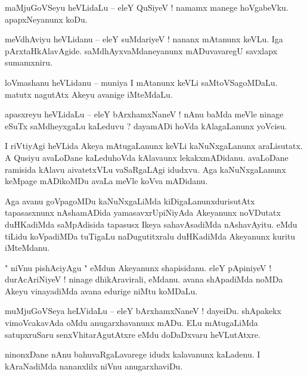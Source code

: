 \documentclass{article}
\begin{document}
\begin{mn}%
maMjuGoVSeyu heVLidaLu -- eleY QuSiyeV ! namamx manege hoVgabeVku. apapxNeyanunx koDu.
\end{mn}

\begin{mn}%
meVdhAviyu heVLidanu -- eleY suMdariyeV ! nananx mAtanunx keVLu. Iga pArxtaHkAlavAgide. 
saMdhAyxvaMdaneyanunx mADuvavaregU savxlapx sumamxniru.
\end{mn}

\begin{mn}%
loVmashanu heVLidanu -- muniya I mAtanunx keVLi saMtoVSagoMDaLu. matutx nagutAtx Akeyu avanige 
iMteMdaLu.
\end{mn}

\begin{mn}%
apasxreyu heVLidaLu -- eleY bArxhamxNaneV ! nAnu baMda meVle ninage eSuTx saMdheyxgaLu kaLeduvu ?  
dayamADi hoVda kAlagaLanunx yoVcisu.
\end{mn}

\begin{mn}%
I riVtiyAgi heVLida Akeya mAtugaLanunx keVLi kaNuNxgaLanunx araLisutatx. A Qusiyu avaLoDane 
kaLeduhoVda kAlavaunx lekakxmADidanu. avaLoDane ramisida kAlavu aivatetxVLu vaSaRgaLAgi idudxvu. 
Aga kaNuNxgaLanunx keMpage mADikoMDu avaLa meVle koVva mADidanu.
\end{mn}

\begin{mn}%
Aga avanu goVpagoMDu kaNuNxgaLiMda kiDigaLanunxdurisutAtx tapasasxnunx nAshamADida 
yamasavxrUpiNiyAda Akeyanunx noVDutatx duHKadiMda saMpAdisida tapasusx Ikeya sahavAsadiMda 
nAshavAyitu. eMdu tiLidu koVpadiMDa tuTigaLu naDugutitxralu duHKadiMda Akeyanunx kuritu iMteMdanu.
\end{mn}

\begin{mn}%
" niVnu pishAciyAgu " eMdun Akeyanunx shapisidanu. eleY pApiniyeV ! durAcAriNiyeV ! ninage 
dhikAravirali, eMdanu. avana shApadiMda noMDa Akeyu vinayadiMda avana edurige niMtu koMDaLu.
\end{mn}

\begin{mn}%
muMjuGoVSeya heLVidaLu -- eleY bArxhamxNaneV ! dayeiDu. shApakekx vimoVcakavAda oMdu 
anugarxhavanunx mADu. ELu mAtugaLiMda satupxruSaru senxVhitarAgutAtxre eMdu doDaDxvaru heVLutAtxre.
\end{mn}

\begin{mn}%
ninonxDane nAnu bahuvaRgaLavarege idudx kalavanunx kaLadenu. I kAraNadiMda nananxlilx niVnu 
anugarxhaviDu.
\end{mn}
\end{document}
